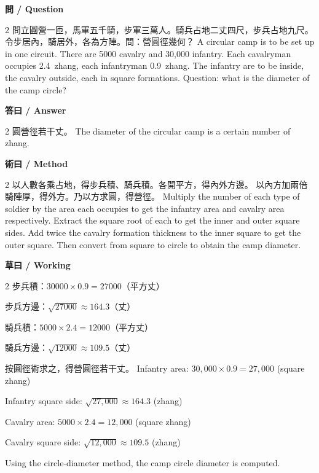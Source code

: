 \documentclass[11pt,a4paper]{article}
\begin{document}
\vspace{0.4em}
\noindent\textbf{\textcolor{chinesecolor}{問} / \textcolor{englishcolor}{Question}}
\vspace{0.3em}
\begin{paracol}{2}
問立圓營一匝，馬軍五千騎，步軍三萬人。騎兵占地二丈四尺，步兵占地九尺。
令步居內，騎居外，各為方陣。問：營圓徑幾何？
\switchcolumn
A circular camp is to be set up in one circuit. There are 5000 cavalry and
30{,}000 infantry. Each cavalryman occupies 2.4~zhang, each infantryman
0.9~zhang. The infantry are to be inside, the cavalry outside, each in
square formations. Question: what is the diameter of the camp circle?
\end{paracol}

\vspace{0.4em}
\noindent\textbf{\textcolor{chinesecolor}{答曰} / \textcolor{englishcolor}{Answer}}
\vspace{0.2em}
\begin{paracol}{2}
圓營徑若干丈。
\switchcolumn
The diameter of the circular camp is a certain number of zhang.
\end{paracol}

\vspace{0.4em}
\noindent\textbf{\textcolor{chinesecolor}{術曰} / \textcolor{englishcolor}{Method}}
\vspace{0.2em}
\begin{paracol}{2}
以人數各乘占地，得步兵積、騎兵積。各開平方，得內外方邊。
以內方加兩倍騎陣厚，得外方。乃以方求圓，得營徑。
\switchcolumn
Multiply the number of each type of soldier by the area each occupies to get
the infantry area and cavalry area respectively. Extract the square root of
each to get the inner and outer square sides. Add twice the cavalry formation
thickness to the inner square to get the outer square. Then convert from
square to circle to obtain the camp diameter.
\end{paracol}

\vspace{0.4em}
\noindent\textbf{\textcolor{chinesecolor}{草曰} / \textcolor{englishcolor}{Working}}
\vspace{0.2em}
\begin{paracol}{2}
步兵積：$30000 \times 0.9 = 27000$（平方丈）

步兵方邊：$\sqrt{27000} \approx 164.3$（丈）

騎兵積：$5000 \times 2.4 = 12000$（平方丈）

騎兵方邊：$\sqrt{12000} \approx 109.5$（丈）

按圓徑術求之，得營圓徑若干丈。
\switchcolumn
Infantry area: $30{,}000 \times 0.9 = 27{,}000$ (square zhang)

Infantry square side: $\sqrt{27{,}000} \approx 164.3$ (zhang)

Cavalry area: $5000 \times 2.4 = 12{,}000$ (square zhang)

Cavalry square side: $\sqrt{12{,}000} \approx 109.5$ (zhang)

Using the circle-diameter method, the camp circle diameter is computed.
\end{paracol}
\end{document}
